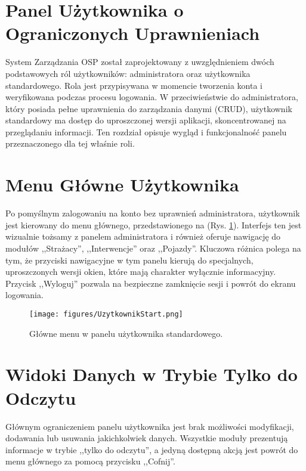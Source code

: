 \section{Panel Użytkownika o Ograniczonych Uprawnieniach}
\label{chap:panel_uzytkownika}

System Zarządzania OSP został zaprojektowany z uwzględnieniem dwóch podstawowych ról użytkowników: administratora oraz użytkownika standardowego. Rola jest przypisywana w momencie tworzenia konta i weryfikowana podczas procesu logowania. W przeciwieństwie do administratora, który posiada pełne uprawnienia do zarządzania danymi (CRUD), użytkownik standardowy ma dostęp do uproszczonej wersji aplikacji, skoncentrowanej na przeglądaniu informacji. Ten rozdział opisuje wygląd i funkcjonalność panelu przeznaczonego dla tej właśnie roli.

\section*{Menu Główne Użytkownika}
\label{sec:menu_uzytkownika}

Po pomyślnym zalogowaniu na konto bez uprawnień administratora, użytkownik jest kierowany do menu głównego, przedstawionego na (Rys. \ref{fig:uzytkownik_start}). Interfejs ten jest wizualnie tożsamy z panelem administratora i również oferuje nawigację do modułów ,,Strażacy'', ,,Interwencje'' oraz ,,Pojazdy''. Kluczowa różnica polega na tym, że przyciski nawigacyjne w tym panelu kierują do specjalnych, uproszczonych wersji okien, które mają charakter wyłącznie informacyjny. Przycisk ,,Wyloguj'' pozwala na bezpieczne zamknięcie sesji i powrót do ekranu logowania.

\begin{figure}[H]
	\centering
	\texttt{[image: figures/UzytkownikStart.png]}
	\caption{Główne menu w panelu użytkownika standardowego.}
	\label{fig:uzytkownik_start}
\end{figure}

\section*{Widoki Danych w Trybie Tylko do Odczytu}
\label{sec:widoki_readonly}

Głównym ograniczeniem panelu użytkownika jest brak możliwości modyfikacji, dodawania lub usuwania jakichkolwiek danych. Wszystkie moduły prezentują informacje w trybie ,,tylko do odczytu'', a jedyną dostępną akcją jest powrót do menu głównego za pomocą przycisku ,,Cofnij''.

